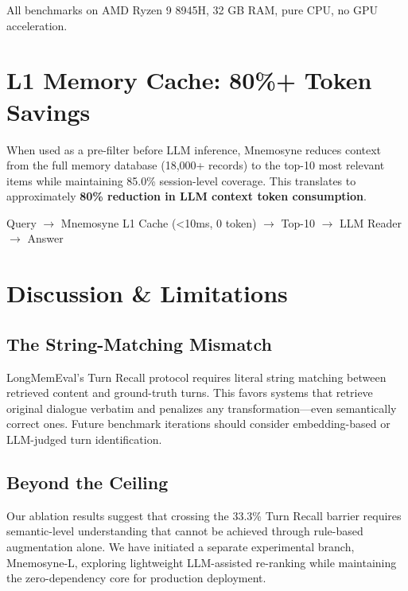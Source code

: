 \documentclass[11pt,a4paper]{article}
\begin{document}
All benchmarks on AMD Ryzen 9 8945H, 32 GB RAM, pure CPU, no GPU acceleration.

\section{L1 Memory Cache: 80\%+ Token Savings}

When used as a pre-filter before LLM inference, Mnemosyne reduces context from the full memory database (18,000+ records) to the top-10 most relevant items while maintaining 85.0\% session-level coverage. This translates to approximately \textbf{80\% reduction in LLM context token consumption}.

\begin{center}
Query $\rightarrow$ Mnemosyne L1 Cache (<10ms, 0 token) $\rightarrow$ Top-10 $\rightarrow$ LLM Reader $\rightarrow$ Answer
\end{center}

\section{Discussion \& Limitations}

\subsection{The String-Matching Mismatch}

LongMemEval's Turn Recall protocol requires literal string matching between retrieved content and ground-truth turns. This favors systems that retrieve original dialogue verbatim and penalizes any transformation---even semantically correct ones. Future benchmark iterations should consider embedding-based or LLM-judged turn identification.

\subsection{Beyond the Ceiling}

Our ablation results suggest that crossing the 33.3\% Turn Recall barrier requires semantic-level understanding that cannot be achieved through rule-based augmentation alone. We have initiated a separate experimental branch, Mnemosyne-L, exploring lightweight LLM-assisted re-ranking while maintaining the zero-dependency core for production deployment.
\end{document}
